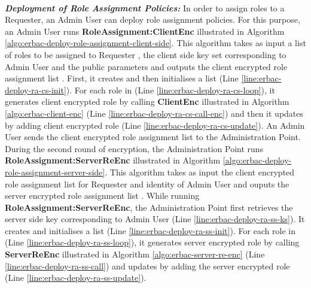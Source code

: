 \documentclass[epsfig,a4paper,11pt,titlepage]{book}
\numberwithin{algorithm}{chapter}
\begin{document}
\noindent \\
\noindent \emph{\textbf{Deployment of Role Assignment Policies:}} 
In order to assign roles to a Requester, an Admin User can deploy role assignment policies. For this purpose, an Admin User runs \textbf{RoleAssignment:ClientEnc} illustrated in Algorithm \ref{algo:erbac-deploy-role-assignment-client-side}. This algorithm takes as input a list of roles  to be assigned to Requester , the client side key set  corresponding to Admin User  and the public parameters  and outputs the client encrypted role assignment list . First, it creates and then initialises a list  (Line \ref{line:erbac-deploy-ra-cs-init}). For each role in  (Line \ref{line:erbac-deploy-ra-cs-loop}), it generates client encrypted role by calling \textbf{ClientEnc} illustrated in Algorithm \ref{algo:erbac-client-enc} (Line \ref{line:erbac-deploy-ra-cs-call-enc}) and then it updates  by adding client encrypted role (Line \ref{line:erbac-deploy-ra-cs-update}). An Admin User sends the client encrypted role assignment list to the Administration Point. 
During the second round of encryption, the Administration Point runs \textbf{RoleAssignment:ServerReEnc} illustrated in Algorithm \ref{algo:erbac-deploy-role-assignment-server-side}. This algorithm takes as input the client encrypted role assignment list  for Requester  and identity  of Admin User and ouputs the server encrypted role assignment list . While running \textbf{RoleAssignment:ServerReEnc}, the Administration Point first retrieves the server side key  corresponding to Admin User  (Line \ref{line:erbac-deploy-ra-ss-ks}). It creates and initialises a list  (Line \ref{line:erbac-deploy-ra-ss-init}). For each role in  (Line \ref{line:erbac-deploy-ra-ss-loop}), it generates server encrypted role by calling \textbf{ServerReEnc} illustrated in Algorithm \ref{algo:erbac-server-re-enc} (Line \ref{line:erbac-deploy-ra-ss-call}) and updates  by adding the server encrypted role (Line \ref{line:erbac-deploy-ra-ss-update}).
\end{document}
